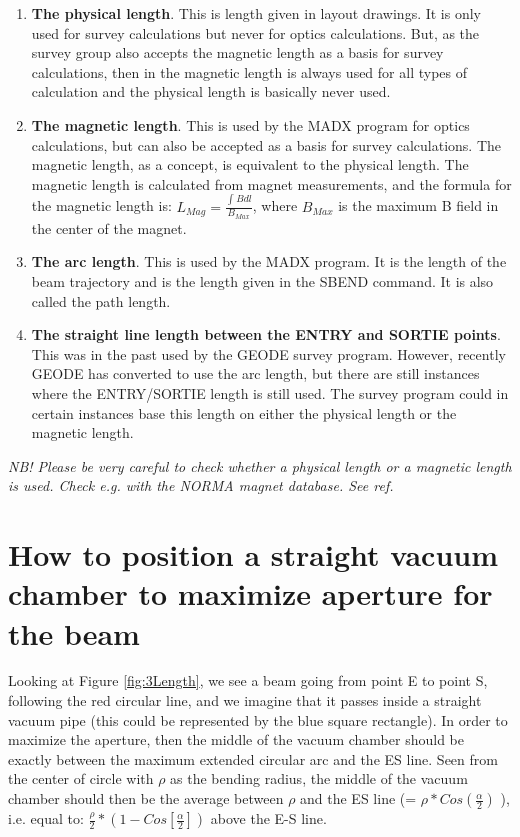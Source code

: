 \documentclass{article}
\begin{document}
\begin{enumerate}
\item \textbf{The physical length}. This is length given in layout drawings. It is only used for survey calculations but never for optics calculations. But, as the survey group also accepts the magnetic length as a basis for survey calculations, then in the magnetic length is always used for all types of calculation and the physical length is basically never used.
\item \textbf{The magnetic length}. This is used by the MADX program for optics calculations, but can also be accepted as a basis for survey calculations. The magnetic length, as a concept, is equivalent to the physical length. The magnetic length is calculated from magnet measurements, and the formula for the magnetic length is: $L_{Mag}=\frac {\int_{ }^{ } B dl}{B_{Max}}$, where $B_{Max}$ is the maximum B field in the center of the magnet.
\item \textbf{The arc length}. This is used by the MADX program. It is the length of the beam trajectory and is the length given in the SBEND command. It is also called the path length.
\item \textbf{The straight line length between the ENTRY and SORTIE points}. This was in the past used by the GEODE survey program. However, recently GEODE has converted to use the arc length, but there are still instances where the ENTRY/SORTIE length is still used. The survey program could in certain instances base this length on either the physical length or the magnetic length.
\end{enumerate}

\noindent \textit{NB! Please be very careful to check whether a physical length or a magnetic length is used. Check e.g. with the NORMA magnet database. See ref.\cite{NORMA} } 

\section{How to position a straight vacuum chamber to maximize aperture for the beam}
Looking at Figure \ref{fig:3Length}, we see a beam going from point E to point S, following the red circular line, and we imagine that it passes inside a straight vacuum pipe (this could be represented by the blue square rectangle). In order to maximize the aperture, then the middle of the vacuum chamber should be exactly between the maximum extended circular arc and the ES line. Seen from the center of circle with $ \rho$ as the bending radius, the middle of the vacuum chamber should then be the average between $ \rho $ and the ES line (= $ \rho *Cos(\frac {\alpha}{2} )$ ), i.e. equal to:
$ \frac{\rho}{2} * (1 - Cos[\frac{\alpha}{2}])$ above the E-S line. \\
\end{document}

